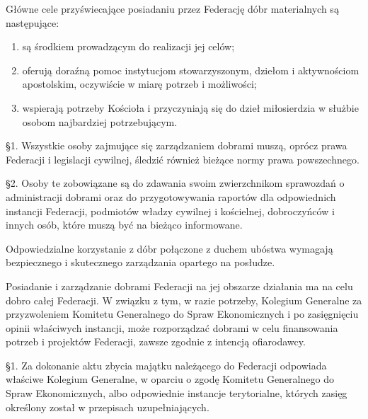  Główne cele przyświecające posiadaniu przez Federację dóbr materialnych są następujące:


\begin{enumerate}


\item są środkiem prowadzącym do realizacji jej celów;


\item oferują doraźną pomoc instytucjom stowarzyszonym, dziełom i aktywnościom apostolskim, oczywiście w miarę potrzeb i możliwości;


\item wspierają potrzeby Kościoła i przyczyniają się do dzieł miłosierdzia w służbie osobom najbardziej potrzebującym.


\end{enumerate}
 




 \S{}1. Wszystkie osoby zajmujące się zarządzaniem dobrami muszą, oprócz prawa Federacji i legislacji cywilnej, śledzić również bieżące normy prawa powszechnego.


\S{}2. Osoby te zobowiązane są do zdawania swoim zwierzchnikom sprawozdań o administracji dobrami oraz do przygotowywania raportów dla odpowiednich instancji Federacji, podmiotów władzy cywilnej i kościelnej, dobroczyńców i innych osób, które muszą być na bieżąco informowane.




 Odpowiedzialne korzystanie z dóbr połączone z duchem ubóstwa wymagają bezpiecznego i skutecznego zarządzania opartego na posłudze.




 Posiadanie i zarządzanie dobrami Federacji na jej obszarze działania ma na celu dobro całej Federacji. W związku z tym, w razie potrzeby, Kolegium Generalne za przyzwoleniem Komitetu Generalnego do Spraw Ekonomicznych i po zasięgnięciu opinii właściwych instancji, może rozporządzać dobrami w celu finansowania potrzeb i projektów Federacji, zawsze zgodnie z intencją ofiarodawcy.
 


 \S{}1. Za dokonanie aktu zbycia majątku należącego do Federacji odpowiada właściwe Kolegium Generalne, w oparciu o zgodę Komitetu Generalnego do Spraw Ekonomicznych, albo odpowiednie instancje terytorialne, których zasięg określony został w przepisach uzupełniających.


